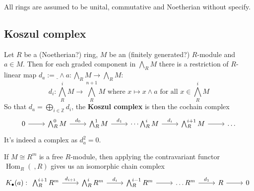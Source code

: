 All rings are assumed to be unital, commutative and Noetherian without specify.

\subsection{Koszul complex}

\begin{definition}



\begin{definition}
	\label{def:minimal_free_resl}
\end{definition}


\begin{proposition}
	\label{prop:loc_resl_min_iff_basis_to_gen}
\end{proposition}


\begin{definition}[KoszulComplex]
	\label{def:KoszulComplex}
	\leanok
	Let $R$ be a (Noetherian?) ring, $M$ be an (finitely generated?) $R$-module and $a \in M$.
	Then for each graded component in $\bigwedge_R M$ there is a restriction of $R$-linear map $d_a := \underline{\ } \wedge a: \bigwedge_R M \to \bigwedge_R M$:
	$$d_i: \bigwedge_R^i M \to \bigwedge_R^{n+1}M \text{ where } x \mapsto x \wedge a \text{ for all } x \in \bigwedge_{R}^i M$$
	So that $d_a = \bigoplus_{i \in \mathbb{Z}}d_i$, the \textbf{Koszul complex} is then the cochain complex
	$$\begin{tikzcd}
		0 \arrow[r] & \bigwedge^{0}_R M \arrow[r, "d_{0}"] & \bigwedge^1_R M \arrow[r, "d_1"] & \dots \bigwedge_R^i M\arrow[r, "d_i"] & \bigwedge_R^{i+1} M \arrow[r] & \dots
	\end{tikzcd}$$
	It's indeed a complex as $d_a^2 = 0$.
\end{definition}

\begin{definition}
	\label{def:DualKoszulComplex}
	If $M \cong R^m$ is a free $R$-module, then applying the contravariant functor $\operatorname{Hom}_R(\ , R)$ gives us an isomorphic chain complex 
	$$K_{\bullet}(a) :\begin{tikzcd}
	\bigwedge^{i+1}_R R^m \arrow[r, "d_{i+1}"] & \bigwedge^i_R R^m \arrow[r, "d_i"] & \bigwedge^{i-1}_R R^m \arrow[r] & \dots R^m \arrow[r, "d_1"] & R \arrow[r] & 0
	\end{tikzcd}$$
\end{definition}


\end{definition}
